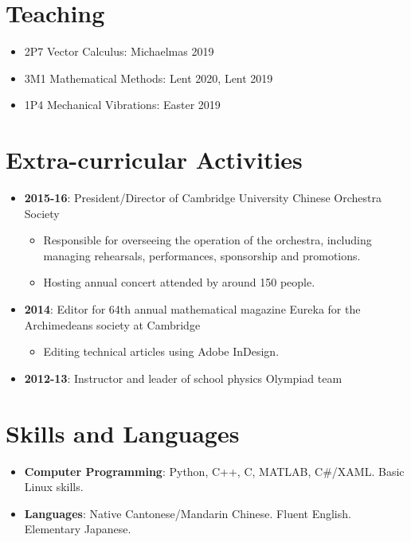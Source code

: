 \documentclass[letterpaper,11pt,oneside]{article}
\begin{document}
\section*{Teaching}
\begin{itemize}
\item 2P7 Vector Calculus: Michaelmas 2019
\item 3M1 Mathematical Methods: Lent 2020, Lent 2019
\item 1P4 Mechanical Vibrations: Easter 2019
\end{itemize}

\section*{Extra-curricular Activities}
\begin{itemize}

\item \textbf{2015-16}: President/Director of Cambridge University Chinese Orchestra Society
\begin{itemize}
\item Responsible for overseeing the operation of the orchestra, including managing rehearsals, performances, sponsorship and promotions.
\item Hosting annual concert attended by around 150 people.
\end{itemize}
\item \textbf{2014}: Editor for 64th annual mathematical magazine Eureka for the Archimedeans society at Cambridge
\begin{itemize}
\item Editing technical articles using Adobe InDesign.
\end{itemize}
\item \textbf{2012-13}: Instructor and leader of school physics Olympiad team

\end{itemize}

\section*{Skills and Languages}
\begin{itemize}
\item \textbf{Computer Programming}: Python, C++, C, MATLAB, C\#/XAML. Basic Linux skills.
\item \textbf{Languages}: Native Cantonese/Mandarin Chinese. Fluent English. Elementary Japanese.
\end{itemize}
\end{document}
